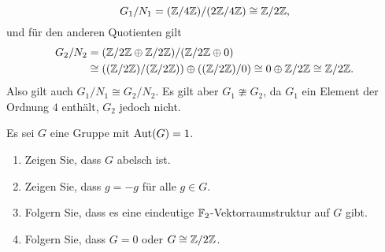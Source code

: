 \begin{solution}
\begin{enumerate}
      \[
              G_1 / N_1
        =     (\mathbb{Z}/4\mathbb{Z}) / (2\mathbb{Z}/4\mathbb{Z})
        \cong \mathbb{Z}/2\mathbb{Z},
      \]
      und für den anderen Quotienten gilt
      \begin{align*}
                G_2 / N_2
        &=      (\mathbb{Z}/2\mathbb{Z} \oplus \mathbb{Z}/2\mathbb{Z}) / (\mathbb{Z}/2\mathbb{Z} \oplus 0)
        \\
        &\cong  ((\mathbb{Z}/2\mathbb{Z})/(\mathbb{Z}/2\mathbb{Z})) \oplus ((\mathbb{Z}/2\mathbb{Z})/0)
        \cong   0 \oplus \mathbb{Z}/2\mathbb{Z}
        \cong   \mathbb{Z}/2\mathbb{Z}.
      \end{align*}
      Also gilt auch $G_1/N_1 \cong G_2/N_2$.
      Es gilt aber $G_1 \ncong G_2$, da $G_1$ ein Element der Ordnung $4$ enthält, $G_2$ jedoch nicht.
  \end{enumerate}
\end{solution}



\begin{question}[subtitle = Gruppen mit trivialer Automorphismengruppe]
  Es sei $G$ eine Gruppe mit $\operatorname{Aut}(G) = 1$.
  \begin{enumerate}
    \item
      Zeigen Sie, dass $G$ abelsch ist.
    \item
      Zeigen Sie, dass $g = -g$ für alle $g \in G$.
    \item
      Folgern Sie, dass es eine eindeutige $\mathbb{F}_2$-Vektorraumstruktur auf $G$ gibt.
    \item
      Folgern Sie, dass $G = 0$ oder $G \cong \mathbb{Z} / 2 \mathbb{Z}$.
  \end{enumerate}
\end{question}


